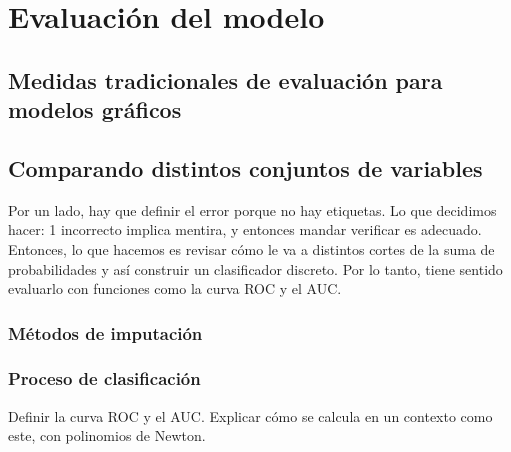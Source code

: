 \chapter{Evaluación del modelo}
\label{chap:evaluacion}
\section*{Medidas tradicionales de evaluación para modelos gráficos}
\section*{Comparando distintos conjuntos de variables}
Por un lado, hay que definir el error porque no hay etiquetas.
Lo que decidimos hacer: 1 incorrecto implica mentira, y entonces mandar verificar es adecuado.
Entonces, lo que hacemos es revisar cómo le va a distintos cortes de la suma de probabilidades y así construir un clasificador discreto. Por lo tanto, tiene sentido evaluarlo con funciones como la curva ROC y el AUC.
\subsection*{Métodos de imputación}
\subsection*{Proceso de clasificación}
Definir la curva ROC y el AUC. Explicar cómo se calcula en un contexto como este, con polinomios de Newton.

